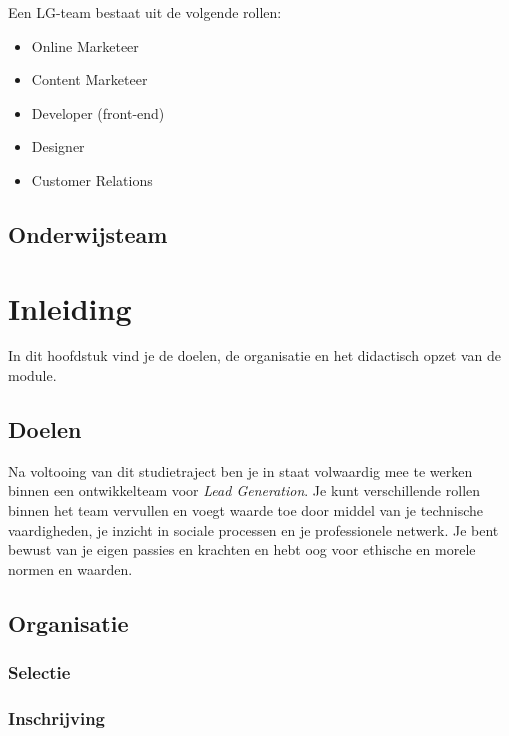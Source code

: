 \documentclass[]{book}
\providecommand{\tightlist}{%
  \setlength{\itemsep}{0pt}\setlength{\parskip}{0pt}}
\begin{document}
Een LG-team bestaat uit de volgende rollen:

\begin{itemize}
\tightlist
\item
  Online Marketeer
\item
  Content Marketeer
\item
  Developer (front-end)
\item
  Designer
\item
  Customer Relations
\end{itemize}

\section{Onderwijsteam}\label{onderwijsteam}

\chapter{Inleiding}\label{inleiding}

In dit hoofdstuk vind je de doelen, de organisatie en het didactisch
opzet van de module.

\section{Doelen}\label{doelen}

Na voltooing van dit studietraject ben je in staat volwaardig mee te
werken binnen een ontwikkelteam voor \emph{Lead Generation}. Je kunt
verschillende rollen binnen het team vervullen en voegt waarde toe door
middel van je technische vaardigheden, je inzicht in sociale processen
en je professionele netwerk. Je bent bewust van je eigen passies en
krachten en hebt oog voor ethische en morele normen en waarden.

\section{Organisatie}\label{organisatie}

\subsection{Selectie}\label{selectie}

\subsection{Inschrijving}\label{inschrijving}
\end{document}
